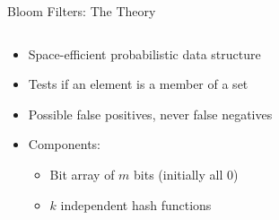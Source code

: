 \begin{frame}{Bloom Filters: The Theory}
  \begin{columns}
    \begin{column}{0.6\textwidth}
      \begin{itemize}
        \item Space-efficient probabilistic data structure \parencite{10.1145/362686.362692}
        \item Tests if an element is a member of a set
        \item Possible false positives, never false negatives
        \item Components:
              \begin{itemize}
                \item Bit array of $m$ bits (initially all 0)
                \item $k$ independent hash functions
              \end{itemize}
      \end{itemize}
    \end{column}
    \begin{column}{0.4\textwidth}
    \end{column}
  \end{columns}
\end{frame}

